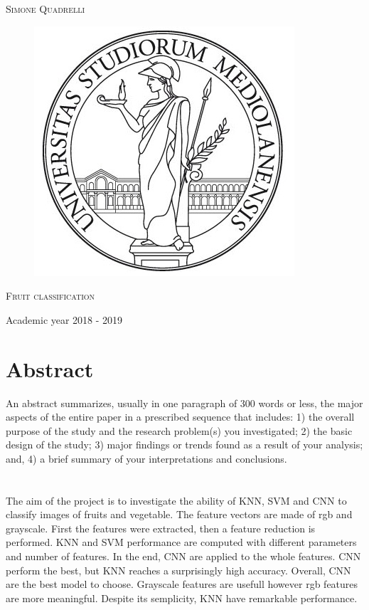 \documentclass{article}
\begin{document}
\begin{titlepage}
	
	
	\begin{center}
		\vspace{2 cm}
		{\Large \textsc{Simone Quadrelli} }
	\end{center}
	
	
	\begin{figure}[H]
		\vspace{2 cm}
		\centering
		\includegraphics[width=0.30\linewidth]{tesiSCIENZE_TECNOLOGIE.jpg}
		
	\end{figure}
	
	\begin{center}
		\vspace{2 cm}
		{\Large \textsc{Fruit classification} }
	\end{center}

	\par
	\vspace{3 cm}
	
	\begin{center}
		{\large Academic year 2018 - 2019}
	\end{center}
\end{titlepage}

\newpage 
{}
\tableofcontents
\listoftables
\listoffigures
\newpage


\section*{Abstract}
An abstract summarizes, usually in one paragraph of 300 words or less, the major aspects of the entire paper in a prescribed sequence that includes: 1) the overall purpose of the study and the research problem(s) you investigated; 2) the basic design of the study; 3) major findings or trends found as a result of your analysis; and, 4) a brief summary of your interpretations and conclusions.
\\\\\\
The aim of the project is to investigate the ability of KNN, SVM and CNN to classify images of fruits and vegetable. The feature vectors are made of rgb and grayscale. First the features were extracted, then a feature reduction is performed. KNN and SVM performance are computed with different parameters and number of features. In the end, CNN are applied to the whole features. CNN perform the best, but KNN reaches a surprisingly high accuracy. Overall, CNN are the best model to choose. Grayscale features are usefull however rgb features are more meaningful. Despite its semplicity, KNN have remarkable performance.
\end{document}
